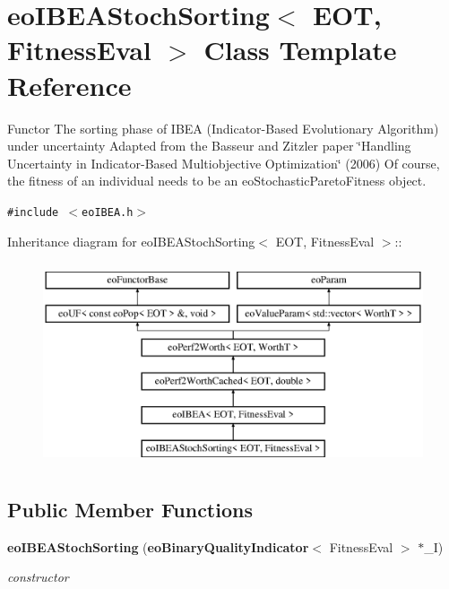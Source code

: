 \section{eo\-IBEAStoch\-Sorting$<$ EOT, Fitness\-Eval $>$ Class Template Reference}
\label{classeoIBEAStochSorting}
Functor The sorting phase of IBEA (Indicator-Based Evolutionary Algorithm) under uncertainty Adapted from the Basseur and Zitzler paper \char`\"{}Handling Uncertainty in Indicator-Based Multiobjective Optimization\char`\"{} (2006) Of course, the fitness of an individual needs to be an eo\-Stochastic\-Pareto\-Fitness object.  


{\tt \#include $<$eo\-IBEA.h$>$}

Inheritance diagram for eo\-IBEAStoch\-Sorting$<$ EOT, Fitness\-Eval $>$::\begin{figure}[H]
\begin{center}
\leavevmode
\includegraphics[height=6cm]{classeoIBEAStochSorting}
\end{center}
\end{figure}
\subsection*{Public Member Functions}
\begin{CompactItemize}
\item 
{\bf eo\-IBEAStoch\-Sorting} ({\bf eo\-Binary\-Quality\-Indicator}$<$ Fitness\-Eval $>$ $\ast$\_\-I)
\begin{CompactList}\small\item\em constructor \item\end{CompactList}\end{CompactItemize}
